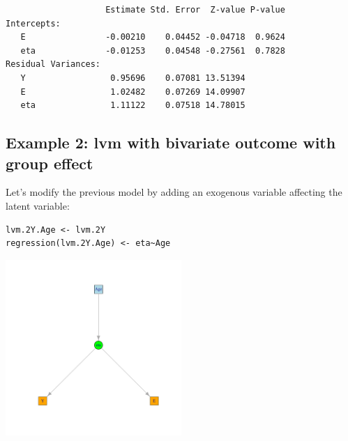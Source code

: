 \documentclass{article}
\begin{document}
\begin{verbatim}
                    Estimate Std. Error  Z-value P-value
Intercepts:                                             
   E                -0.00210    0.04452 -0.04718  0.9624
   eta              -0.01253    0.04548 -0.27561  0.7828
Residual Variances:                                     
   Y                 0.95696    0.07081 13.51394        
   E                 1.02482    0.07269 14.09907        
   eta               1.11122    0.07518 14.78015
\end{verbatim}

\subsection{Example 2: lvm with bivariate outcome with group effect}
\label{sec:orgc4cc5b6}
Let's modify the previous model by adding an exogenous variable
affecting the latent variable:

\lstset{language=r,label= ,caption= ,captionpos=b,numbers=none}
\begin{lstlisting}
lvm.2Y.Age <- lvm.2Y
regression(lvm.2Y.Age) <- eta~Age
\end{lstlisting}

\begin{center}
\includegraphics[width=0.5\textwidth]{./figures/show-bivariateLVM-Age.pdf}
\end{center}
\end{document}
